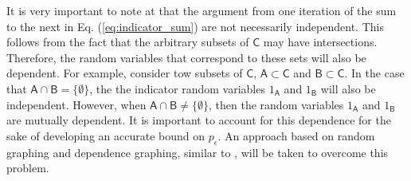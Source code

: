 It is very important to note at that the argument from one iteration of the sum to the next in Eq. (\ref{eq:indicator_sum}) are not necessarily independent. This follows from the fact that the arbitrary subsets of $\mathsf{C}$ may have intersections. Therefore, the random variables that correspond to these sets will also be dependent. For example, consider tow subsets of $\mathsf{C}$, $\mathsf{A}\subset\mathsf{C}$ and $\mathsf{B}\subset\mathsf{C}$. In the case that $\mathsf{A}\cap\mathsf{B} = \lbrace \emptyset \rbrace$, the the indicator random variables $1_{\mathsf{A}}$ and $1_\mathsf{B}$ will also be independent. However, when $\mathsf{A}\cap\mathsf{B} \neq \lbrace \emptyset \rbrace$, then the random variables $1_{\mathsf{A}}$ and $1_\mathsf{B}$ are mutually dependent. It is important to account for this dependence for the sake of developing an accurate bound on $p_\epsilon$. An approach based on random graphing and dependence graphing, similar to \cite{Swannack2005}, \cite{Janson2004} will be taken to overcome this problem.